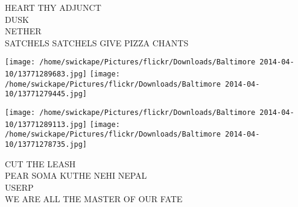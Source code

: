 \documentclass[10pt,letterpaper]{article}
\begin{document}
HEART THY ADJUNCT\\
DUSK\\
NETHER\\
SATCHELS SATCHELS GIVE PIZZA CHANTS
\pagebreak

\texttt{[image: /home/swickape/Pictures/flickr/Downloads/Baltimore 2014-04-10/13771289683.jpg]}
\texttt{[image: /home/swickape/Pictures/flickr/Downloads/Baltimore 2014-04-10/13771279445.jpg]}

\texttt{[image: /home/swickape/Pictures/flickr/Downloads/Baltimore 2014-04-10/13771289113.jpg]}
\texttt{[image: /home/swickape/Pictures/flickr/Downloads/Baltimore 2014-04-10/13771278735.jpg]}

CUT THE LEASH\\
PEAR SOMA KUTHE NEHI NEPAL\\
USERP\\
WE ARE ALL THE MASTER OF OUR FATE
\pagebreak
\end{document}
